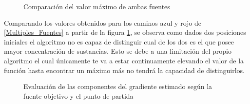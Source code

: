 \begin{figure}[H]
  \begin{center}
    \caption{Comparación del valor máximo de ambas fuentes}
    \label{Fun_Gauss_Multi}
  \end{center}
\end{figure}

Comparando los valores obtenidos para los caminos azul y rojo de \ref{Multiples_Fuentes} a partir de la figura \ref{Fun_Gauss_Multi}, se observa como dados dos posiciones iniciales el algoritmo no es capaz de distinguir cual de los dos es el que posee mayor concentración de sustancias. Esto se debe a una limitación del propio algoritmo el cual únicamente te va a estar continuamente elevando el valor de la función hasta encontrar un máximo más no tendrá la capacidad de distinguirlos.

\begin{figure}[H]
  \begin{center}
    \caption{Evaluación de las componentes del gradiente estimado según la fuente objetivo y el punto de partida}
    \label{Comp_Multi_Gaussian}
  \end{center}
\end{figure}

